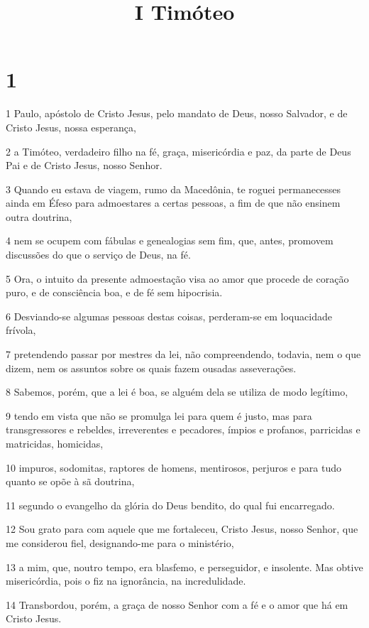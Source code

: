 

\title{I Timóteo}


\chapter{1}

\par 1 Paulo, apóstolo de Cristo Jesus, pelo mandato de Deus, nosso Salvador, e de Cristo Jesus, nossa esperança,
\par 2 a Timóteo, verdadeiro filho na fé, graça, misericórdia e paz, da parte de Deus Pai e de Cristo Jesus, nosso Senhor.
\par 3 Quando eu estava de viagem, rumo da Macedônia, te roguei permanecesses ainda em Éfeso para admoestares a certas pessoas, a fim de que não ensinem outra doutrina,
\par 4 nem se ocupem com fábulas e genealogias sem fim, que, antes, promovem discussões do que o serviço de Deus, na fé.
\par 5 Ora, o intuito da presente admoestação visa ao amor que procede de coração puro, e de consciência boa, e de fé sem hipocrisia.
\par 6 Desviando-se algumas pessoas destas coisas, perderam-se em loquacidade frívola,
\par 7 pretendendo passar por mestres da lei, não compreendendo, todavia, nem o que dizem, nem os assuntos sobre os quais fazem ousadas asseverações.
\par 8 Sabemos, porém, que a lei é boa, se alguém dela se utiliza de modo legítimo,
\par 9 tendo em vista que não se promulga lei para quem é justo, mas para transgressores e rebeldes, irreverentes e pecadores, ímpios e profanos, parricidas e matricidas, homicidas,
\par 10 impuros, sodomitas, raptores de homens, mentirosos, perjuros e para tudo quanto se opõe à sã doutrina,
\par 11 segundo o evangelho da glória do Deus bendito, do qual fui encarregado.
\par 12 Sou grato para com aquele que me fortaleceu, Cristo Jesus, nosso Senhor, que me considerou fiel, designando-me para o ministério,
\par 13 a mim, que, noutro tempo, era blasfemo, e perseguidor, e insolente. Mas obtive misericórdia, pois o fiz na ignorância, na incredulidade.
\par 14 Transbordou, porém, a graça de nosso Senhor com a fé e o amor que há em Cristo Jesus.
